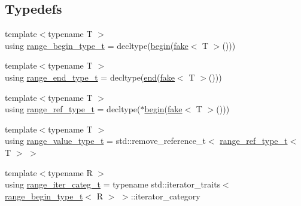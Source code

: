 \subsection*{Typedefs}
\begin{DoxyCompactItemize}
\item 
{\footnotesize template$<$typename T $>$ }\\using \mbox{\hyperlink{namespacerah_a28aff4eeddcece6be65ff0b956d32d4a}{range\+\_\+begin\+\_\+type\+\_\+t}} = decltype(\mbox{\hyperlink{namespacerah_a2c4a19e57cc4e0753e93830f247def6d}{begin}}(\mbox{\hyperlink{namespacerah_a11785bbdf970efa1bc57fc14993b77bf}{fake}}$<$ T $>$()))
\item 
{\footnotesize template$<$typename T $>$ }\\using \mbox{\hyperlink{namespacerah_a9657e24ae477f4482225b133fe286b65}{range\+\_\+end\+\_\+type\+\_\+t}} = decltype(\mbox{\hyperlink{namespacerah_aaddd1442cd76b96876e692cdefe7261d}{end}}(\mbox{\hyperlink{namespacerah_a11785bbdf970efa1bc57fc14993b77bf}{fake}}$<$ T $>$()))
\item 
{\footnotesize template$<$typename T $>$ }\\using \mbox{\hyperlink{namespacerah_a6622426bea22e9509614fe4c574ebeca}{range\+\_\+ref\+\_\+type\+\_\+t}} = decltype($\ast$\mbox{\hyperlink{namespacerah_a2c4a19e57cc4e0753e93830f247def6d}{begin}}(\mbox{\hyperlink{namespacerah_a11785bbdf970efa1bc57fc14993b77bf}{fake}}$<$ T $>$()))
\item 
{\footnotesize template$<$typename T $>$ }\\using \mbox{\hyperlink{namespacerah_a4b32e39fb106af7036b20a39c4f024c1}{range\+\_\+value\+\_\+type\+\_\+t}} = std\+::remove\+\_\+reference\+\_\+t$<$ \mbox{\hyperlink{namespacerah_a6622426bea22e9509614fe4c574ebeca}{range\+\_\+ref\+\_\+type\+\_\+t}}$<$ T $>$ $>$
\item 
{\footnotesize template$<$typename R $>$ }\\using \mbox{\hyperlink{namespacerah_aff9b9a5748e293f6a1726308c1ac1a01}{range\+\_\+iter\+\_\+categ\+\_\+t}} = typename std\+::iterator\+\_\+traits$<$ \mbox{\hyperlink{namespacerah_a28aff4eeddcece6be65ff0b956d32d4a}{range\+\_\+begin\+\_\+type\+\_\+t}}$<$ R $>$ $>$\+::iterator\+\_\+category
\end{DoxyCompactItemize}
